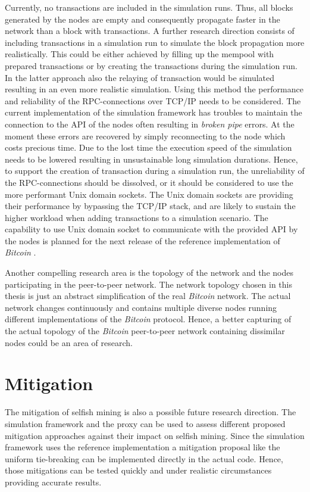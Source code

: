 Currently, no transactions are included in the simulation runs.
Thus, all blocks generated by the nodes are empty and consequently propagate faster in the network than a block with transactions.
A further research direction consists of including transactions in a simulation run to simulate the block propagation more realistically.
This could be either achieved by filling up the mempool with prepared transactions  or by creating the transactions during the simulation run.
In the latter approach also the relaying of transaction would be simulated resulting in an even more realistic simulation.
Using this method the performance and reliability of the RPC-connections over TCP/IP needs to be considered.
The current implementation of the simulation framework has troubles to maintain the connection to the API of the nodes often resulting in \textit{broken pipe} errors.
At the moment these errors are recovered by simply reconnecting to the node which costs precious time.
Due to the lost time the execution speed of the simulation needs to be lowered resulting in unsustainable long simulation durations.
Hence, to support the creation of transaction during a simulation run, the unreliability of the RPC-connections should be dissolved, or it should be considered to use the more performant Unix domain sockets.
The Unix domain sockets are providing their performance by bypassing the TCP/IP stack, and are likely to sustain the higher workload when adding transactions to a simulation scenario.
The capability to use Unix domain socket to communicate with the provided API by the nodes is planned for the next release of the reference implementation of \textit{Bitcoin} \cite{bitcoinunixdomainsockets}.

Another compelling research area is the topology of the network and the nodes participating in the peer-to-peer network.
The network topology chosen in this thesis is just an abstract simplification of the real \textit{Bitcoin} network.
The actual network changes continuously and contains multiple diverse nodes running different implementations of the \textit{Bitcoin} protocol.
Hence, a better capturing of the actual topology of the \textit{Bitcoin} peer-to-peer network containing dissimilar nodes could be an area of research.

\section{Mitigation}

The mitigation of selfish mining is also a possible future research direction.
The simulation framework and the proxy can be used to assess different proposed mitigation approaches \cite{eyal2014majority, billah2015one, solat2016zeroblock, zhang2017publish} against their impact on selfish mining.
Since the simulation framework uses the reference implementation a mitigation proposal like the uniform tie-breaking \cite{eyal2014majority} can be implemented directly in the actual code.
Hence, those mitigations can be tested quickly and under realistic circumstances providing accurate results.
